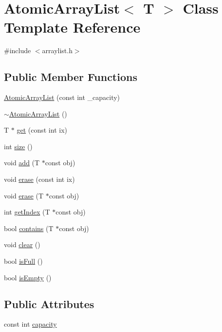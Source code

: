 \hypertarget{classAtomicArrayList}{}\section{Atomic\+Array\+List$<$ T $>$ Class Template Reference}
\label{classAtomicArrayList}


{\ttfamily \#include $<$arraylist.\+h$>$}

\subsection*{Public Member Functions}
\begin{DoxyCompactItemize}
\item 
\hyperlink{classAtomicArrayList_a0eff0d932ebe8b70dbe405688b8419f4}{Atomic\+Array\+List} (const int \+\_\+capacity)
\item 
\hyperlink{classAtomicArrayList_a21884144e433db89fb1120cd8e40a2c6}{$\sim$\+Atomic\+Array\+List} ()
\item 
T $\ast$ \hyperlink{classAtomicArrayList_ad8d99fc200487d2fe318538037937090}{get} (const int ix)
\item 
int \hyperlink{classAtomicArrayList_ab180e7e26cfa160e1ea31c0c911da51e}{size} ()
\item 
void \hyperlink{classAtomicArrayList_aa8b53ecb83b2565ec0b62e5681c29eb8}{add} (T $\ast$const obj)
\item 
void \hyperlink{classAtomicArrayList_aaa93ef37c8605757e36dfbeaf46bcc20}{erase} (const int ix)
\item 
void \hyperlink{classAtomicArrayList_a742e41c76b857c5f6950f47a827524a2}{erase} (T $\ast$const obj)
\item 
int \hyperlink{classAtomicArrayList_a5ec8d715f9d33bb1a997cd8b2d71abb7}{get\+Index} (T $\ast$const obj)
\item 
bool \hyperlink{classAtomicArrayList_ae85b1f8c002815f4e7306b845cba23ea}{contains} (T $\ast$const obj)
\item 
void \hyperlink{classAtomicArrayList_a5369a041e550e8c1c180f2a2f2aa406a}{clear} ()
\item 
bool \hyperlink{classAtomicArrayList_a12841c46537a754e9fd5b4cbd32c3d68}{is\+Full} ()
\item 
bool \hyperlink{classAtomicArrayList_aa783ae1f37a2ce221e7309dc482770ad}{is\+Empty} ()
\end{DoxyCompactItemize}
\subsection*{Public Attributes}
\begin{DoxyCompactItemize}
\item 
const int \hyperlink{classAtomicArrayList_a2efa86441dbc7ef4d36ed772fb352a71}{capacity}
\end{DoxyCompactItemize}


